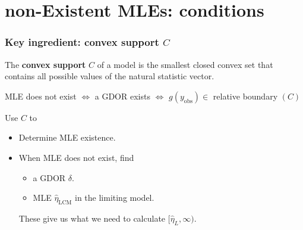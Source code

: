 \documentclass[ 10pt]{beamer}
\newcommand{\etaLCM}{\hat{\eta}_{\textrm{LCM}}}
\newcommand{\yobs}{y_{\text{obs}}}
\begin{document}
\section{non-Existent MLEs: conditions}
\frame
{
  \frametitle{Key ingredient: convex support $C$}  
The \textbf{convex support} $C$ of a model is the smallest closed convex set that contains 
all possible values of the natural statistic vector.
\vspace{2mm}

\begin{theorem} %
MLE does not exist $\iff$ a GDOR exists $\iff$ $g(\yobs) \in$ relative boundary $(C)$
\end{theorem}
\vspace{2mm}


Use $C$ to
\begin{itemize}
\item Determine MLE existence.
\item When MLE does not exist, find
\begin{itemize}
	\item	a GDOR $\delta$.
	\item 	MLE $\etaLCM$ in the limiting model.
\end{itemize}
	These give us what we need to calculate $[\hat{\eta}_L, \infty)$.
\end{itemize}

}
\end{document}
